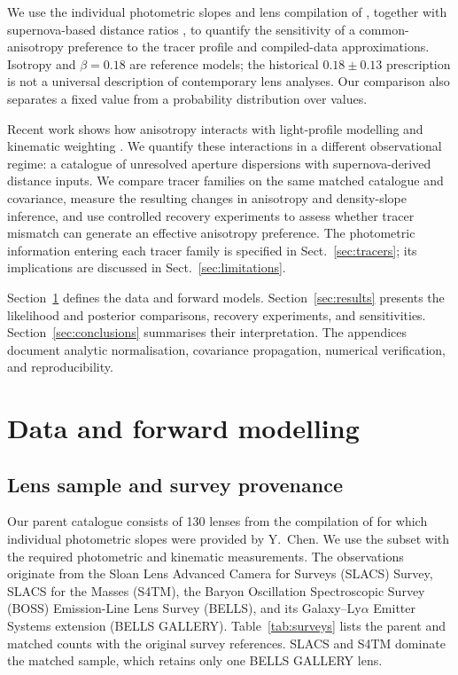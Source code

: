 \documentclass{aa}
\begin{document}
We use the individual photometric slopes and lens compilation of \citet{stz1902}, together with supernova-based distance ratios \citep{Hu2023p,Hu2023,Geng2025}, to quantify the sensitivity of a common-anisotropy preference to the tracer profile and compiled-data approximations. Isotropy and $\beta=0.18$ are reference models; the historical $0.18\pm0.13$ prescription \citep{Gerhard2001,stz1902} is not a universal description of contemporary lens analyses. Our comparison also separates a fixed value from a probability distribution over values.

Recent work shows how anisotropy interacts with light-profile modelling and kinematic weighting \citep{Fores2026,Verma2026}. We quantify these interactions in a different observational regime: a catalogue of unresolved aperture dispersions with supernova-derived distance inputs. We compare tracer families on the same matched catalogue and covariance, measure the resulting changes in anisotropy and density-slope inference, and use controlled recovery experiments to assess whether tracer mismatch can generate an effective anisotropy preference. The photometric information entering each tracer family is specified in Sect.~\ref{sec:tracers}; its implications are discussed in Sect.~\ref{sec:limitations}.

Section~\ref{sec:data} defines the data and forward models. Section~\ref{sec:results} presents the likelihood and posterior comparisons, recovery experiments, and sensitivities. Section~\ref{sec:conclusions} summarises their interpretation. The appendices document analytic normalisation, covariance propagation, numerical verification, and reproducibility.

\section{Data and forward modelling}\label{sec:data}
\subsection{Lens sample and survey provenance}
\label{sec:lenses}

Our parent catalogue consists of 130 lenses from the compilation of \citet{stz1902} for which individual photometric slopes were provided by Y.~Chen. We use the subset with the required photometric and kinematic measurements. The observations originate from the Sloan Lens Advanced Camera for Surveys (SLACS) Survey, SLACS for the Masses (S4TM), the Baryon Oscillation Spectroscopic Survey (BOSS) Emission-Line Lens Survey (BELLS), and its Galaxy--Ly$\alpha$ Emitter Systems extension (BELLS GALLERY). Table~\ref{tab:surveys} lists the parent and matched counts with the original survey references. SLACS and S4TM dominate the matched sample, which retains only one BELLS GALLERY lens.
\end{document}
